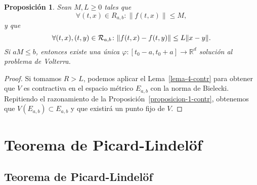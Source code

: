\documentclass[11pt]{article}
\theoremstyle{plain}
\newtheorem{proposition}{Proposición}
\theoremstyle{definition}
\theoremstyle{remark}
\begin{document}
\begin{proposition}\label{proposicion-2-contr}
Sean $M,L \geq 0$ tales que
\[
\forall (t,x) \in R_{a,b}\colon \|f(t,x)\| \leq M,
\]
y que
\[
\forall (t,x),(t,y) \in {\cal R}_{a,b}\colon \|f(t,x)-f(t,y)\| \leq L\|x-y\|.
\]
Si $aM\leq b$, entonces existe una única $\varphi\colon [t_0-a,t_0+a] \to \mathbb{R}^d$
solución al problema de Volterra.
\end{proposition}
\begin{proof}
  Si tomamos $R > L$, podemos aplicar el Lema~\ref{lema-4-contr} para
  obtener que $V$ es contractiva en el espacio métrico $E_{a,b}$ con la
  norma de Bielecki. Repitiendo el razonamiento de la Proposición~\ref{proposicion-1-contr},
  obtenemos que $V(E_{a,b}) \subset E_{a,b}$ y que existirá un punto
  fijo de $V$.
\end{proof}

\section{Teorema de Picard-Lindelöf}

\subsection{Teorema de Picard-Lindelöf}
\end{document}
